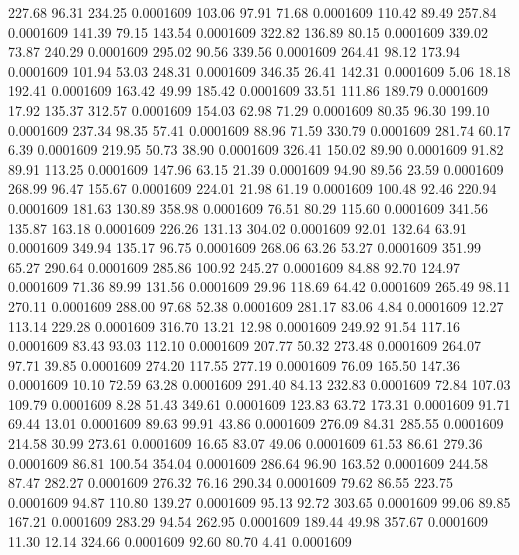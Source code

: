  227.68   96.31  234.25   0.0001609
 103.06   97.91   71.68   0.0001609
 110.42   89.49  257.84   0.0001609
 141.39   79.15  143.54   0.0001609
 322.82  136.89   80.15   0.0001609
 339.02   73.87  240.29   0.0001609
 295.02   90.56  339.56   0.0001609
 264.41   98.12  173.94   0.0001609
 101.94   53.03  248.31   0.0001609
 346.35   26.41  142.31   0.0001609
   5.06   18.18  192.41   0.0001609
 163.42   49.99  185.42   0.0001609
  33.51  111.86  189.79   0.0001609
  17.92  135.37  312.57   0.0001609
 154.03   62.98   71.29   0.0001609
  80.35   96.30  199.10   0.0001609
 237.34   98.35   57.41   0.0001609
  88.96   71.59  330.79   0.0001609
 281.74   60.17    6.39   0.0001609
 219.95   50.73   38.90   0.0001609
 326.41  150.02   89.90   0.0001609
  91.82   89.91  113.25   0.0001609
 147.96   63.15   21.39   0.0001609
  94.90   89.56   23.59   0.0001609
 268.99   96.47  155.67   0.0001609
 224.01   21.98   61.19   0.0001609
 100.48   92.46  220.94   0.0001609
 181.63  130.89  358.98   0.0001609
  76.51   80.29  115.60   0.0001609
 341.56  135.87  163.18   0.0001609
 226.26  131.13  304.02   0.0001609
  92.01  132.64   63.91   0.0001609
 349.94  135.17   96.75   0.0001609
 268.06   63.26   53.27   0.0001609
 351.99   65.27  290.64   0.0001609
 285.86  100.92  245.27   0.0001609
  84.88   92.70  124.97   0.0001609
  71.36   89.99  131.56   0.0001609
  29.96  118.69   64.42   0.0001609
 265.49   98.11  270.11   0.0001609
 288.00   97.68   52.38   0.0001609
 281.17   83.06    4.84   0.0001609
  12.27  113.14  229.28   0.0001609
 316.70   13.21   12.98   0.0001609
 249.92   91.54  117.16   0.0001609
  83.43   93.03  112.10   0.0001609
 207.77   50.32  273.48   0.0001609
 264.07   97.71   39.85   0.0001609
 274.20  117.55  277.19   0.0001609
  76.09  165.50  147.36   0.0001609
  10.10   72.59   63.28   0.0001609
 291.40   84.13  232.83   0.0001609
  72.84  107.03  109.79   0.0001609
   8.28   51.43  349.61   0.0001609
 123.83   63.72  173.31   0.0001609
  91.71   69.44   13.01   0.0001609
  89.63   99.91   43.86   0.0001609
 276.09   84.31  285.55   0.0001609
 214.58   30.99  273.61   0.0001609
  16.65   83.07   49.06   0.0001609
  61.53   86.61  279.36   0.0001609
  86.81  100.54  354.04   0.0001609
 286.64   96.90  163.52   0.0001609
 244.58   87.47  282.27   0.0001609
 276.32   76.16  290.34   0.0001609
  79.62   86.55  223.75   0.0001609
  94.87  110.80  139.27   0.0001609
  95.13   92.72  303.65   0.0001609
  99.06   89.85  167.21   0.0001609
 283.29   94.54  262.95   0.0001609
 189.44   49.98  357.67   0.0001609
  11.30   12.14  324.66   0.0001609
  92.60   80.70    4.41   0.0001609
